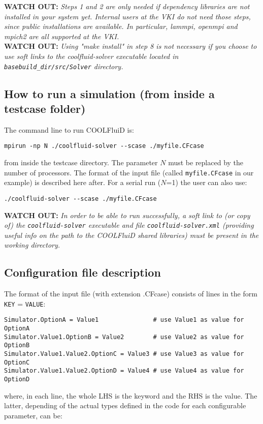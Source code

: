 \documentclass[11pt]{article}
\begin{document}
{\bf WATCH OUT:} {\it Steps 1 and 2 are only needed if dependency libraries are not installed in your system yet. Internal users at the VKI do not need those steps, since public installations are available. In particular, lammpi, openmpi and mpich2 are all supported at the VKI.
}  \\

{\bf WATCH OUT:} {\it Using "make install" in step 8 is not necessary if you choose to use soft links to the coolfluid-solver executable located in
  \texttt{basebuild\_dir/src/Solver} directory.  
}

\subsection{How to run a simulation (from inside a testcase folder)}

The command line to run COOLFluiD is: 

\begin{verbatim}
mpirun -np N ./coolfluid-solver --scase ./myfile.CFcase
\end{verbatim}
from inside the testcase directory. The parameter $N$ must be replaced by the number of 
processors. The format of the input file (called {\tt myfile.CFcase} in our example) is described here after.
For a serial run ($N$=1) the user can also use:

\begin{verbatim}
./coolfluid-solver --scase ./myfile.CFcase
\end{verbatim}

{\bf WATCH OUT:} {\it In order to be able to run successfully, a soft link to (or copy of) the {\tt coolfluid-solver} executable and file {\tt coolfluid-solver.xml} (providing useful info on the path to the COOLFluiD shared libraries) must be present in the working directory.}
 
\subsection{Configuration file description}

The format of the input file (with extension .CFcase) consists of lines in the form {\tt KEY} = {\tt VALUE}:
\vspace{-0.2cm}
\begin{verbatim}
Simulator.OptionA = Value1               # use Value1 as value for OptionA
Simulator.Value1.OptionB = Value2        # use Value2 as value for OptionB
Simulator.Value1.Value2.OptionC = Value3 # use Value3 as value for OptionC
Simulator.Value1.Value2.OptionD = Value4 # use Value4 as value for OptionD
\end{verbatim} 
where, in each line, the whole LHS is the keyword and the RHS is the value. The
latter, depending of the actual types defined in the code for each configurable parameter, can be:
\end{document}

